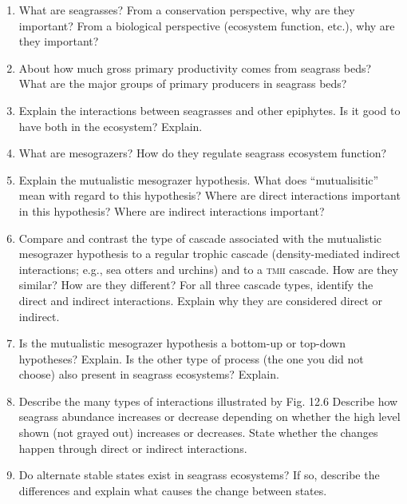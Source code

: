 \documentclass[letterpaper]{tufte-handout}
\begin{document}
\begin{enumerate}

\item What are seagrasses? From a conservation perspective, why are they important? From a biological perspective (ecosystem function, etc.), why are they important?

\item About how much gross primary productivity comes from seagrass beds? What are the major groups of primary producers in seagrass beds?
	
\item Explain the interactions between seagrasses and other epiphytes. Is it good to have both in the ecosystem? Explain.	

\item
  What are mesograzers? How do they regulate seagrass ecosystem function? 
  
\item Explain the mutualistic mesograzer hypothesis. What does ``mutualisitic'' mean with regard to this hypothesis? Where are direct interactions important in this hypothesis? Where are indirect interactions important?

\item
  Compare and contrast the type of cascade associated with the mutualistic mesograzer hypothesis to a regular trophic cascade (density-mediated indirect interactions; e.g., sea otters and urchins) and to a \textsc{tmii} cascade. How are they similar? How are they different? For all three cascade types, identify the direct and indirect interactions. Explain why they are considered direct or indirect.

\item
  Is the mutualistic mesograzer hypothesis a bottom-up or top-down hypotheses? Explain. Is the other type of process (the one you did not choose) also present in seagrass ecosystems? Explain.
  
\item Describe the many types of interactions illustrated by Fig. 12.6 Describe how seagrass abundance increases or decrease depending on whether the high level shown (not grayed out) increases or decreases. State whether the changes happen through direct or indirect interactions.

\item Do alternate stable states exist in seagrass ecosystems?  If so, describe the differences and explain what causes the change between states.

\end{enumerate}
\end{document}
